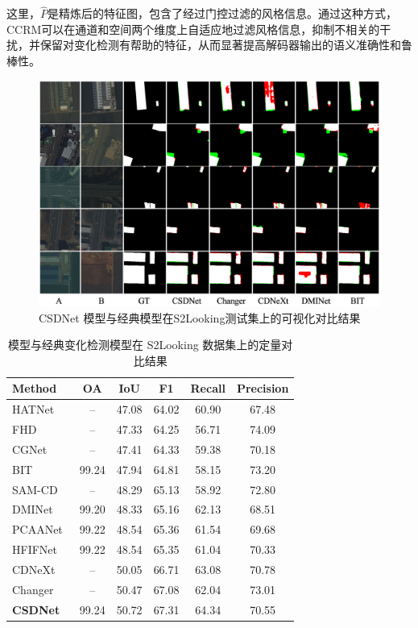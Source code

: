 \noindent
这里，\(\hat P\)是精炼后的特征图，包含了经过门控过滤的风格信息。通过这种方式，CCRM可以在通道和空间两个维度上自适应地过滤风格信息，抑制不相关的干扰，并保留对变化检测有帮助的特征，从而显著提高解码器输出的语义准确性和鲁棒性。


\begin{figure}[!htb]
	\centering
	\includegraphics[width=\textwidth]{paper_figures/基于双时相遥感影像风格解缠和内容细化增强遥感变化检测方法/csdnet_s2looking.png}
	\caption{CSDNet 模型与经典模型在S2Looking测试集上的可视化对比结果}
	\label{fig:csdnet_s2looking}
\end{figure}

\begin{table}[!htb]
\centering
\caption{模型与经典变化检测模型在 S2Looking 数据集上的定量对比结果}
\label{tab:csdnet_s2looking}
\begin{tabular}{l c c c c c}
\toprule
Method & OA & IoU & F1 & Recall & Precision \\
\midrule
HATNet~\cite{Xu2024HybridAT} & -- & 47.08 & 64.02 & 60.90 & 67.48 \\
FHD~\cite{Pei2022FeatureHD} & -- & 47.33 & 64.25 & 56.71 & 74.09 \\
CGNet~\cite{han_change_2023} & -- & 47.41 & 64.33 & 59.38 & 70.18 \\
BIT~\cite{chen_remote_2022} & 99.24 & 47.94 & 64.81 & 58.15 & 73.20 \\
SAM-CD~\cite{ding2024adapting} & -- & 48.29 & 65.13 & 58.92 & 72.80 \\
DMINet~\cite{feng_change_2023} & 99.20 & 48.33 & 65.16 & 62.13 & 68.51 \\
PCAANet~\cite{Xu2023ProgressiveCA} & 99.22 & 48.54 & 65.36 & 61.54 & 69.68 \\
HFIFNet~\cite{Han2025HFIFNetHF} & 99.22 & 48.54 & 65.35 & 61.04 & 70.33 \\
CDNeXt~\cite{wei_robust_2024} & -- & 50.05 & 66.71 & 63.08 & 70.78 \\
Changer~\cite{Fang2022ChangerFI} & -- & 50.47 & 67.08 & 62.04 & 73.01 \\
\textbf{CSDNet} & 99.24 & 50.72 & 67.31 & 64.34 & 70.55 \\
\bottomrule
\end{tabular}%
\end{table}

